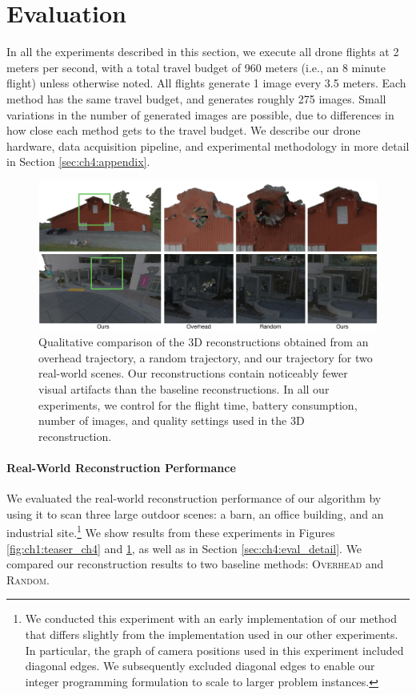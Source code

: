 \section{Evaluation}

In all the experiments described in this section, we execute all drone flights at 2 meters per second, with a total travel budget of 960 meters (i.e., an 8 minute flight) unless otherwise noted.
All flights generate 1 image every 3.5 meters.
Each method has the same travel budget, and generates roughly 275 images.
Small variations in the number of generated images are possible, due to differences in how close each method gets to the travel budget.
We describe our drone hardware, data acquisition pipeline, and experimental methodology in more detail in Section \ref{sec:ch4:appendix}.

\begin{figure}[t]
\begin{center}
\includegraphics[width=6.0in]{images/2017_iccv/real_world_results.jpg}
\end{center}
\caption{
Qualitative comparison of the 3D reconstructions obtained from an overhead trajectory, a random trajectory, and our trajectory for two real-world scenes.
Our reconstructions contain noticeably fewer visual artifacts than the baseline reconstructions.
In all our experiments, we control for the flight time, battery consumption, number of images, and quality settings used in the 3D reconstruction.
}
\label{fig:ch4:results_side_by_side}
\end{figure}

\paragraph{Real-World Reconstruction Performance}
We evaluated the real-world reconstruction performance of our algorithm by using it to scan three large outdoor scenes: a barn, an office building, and an industrial site.\footnote{We
conducted this experiment with an early implementation of our method that differs slightly from the implementation used in our other experiments.
In particular, the graph of camera positions used in this experiment included diagonal edges.
We subsequently excluded diagonal edges to enable our integer programming formulation to scale to larger problem instances. 
}
We show results from these experiments in Figures \ref{fig:ch1:teaser_ch4} and \ref{fig:ch4:results_side_by_side}, as well as in Section \ref{sec:ch4:eval_detail}.
We compared our reconstruction results to two baseline methods: \textsc{Overhead} and \textsc{Random}.

